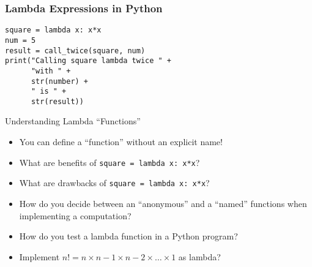 \documentclass[14pt,aspectratio=169]{beamer}
\begin{document}
%
\begin{frame}[fragile]
  \frametitle{Lambda Expressions in Python}
  \hspace*{-.1in}
  \begin{minipage}{6in}
    \begin{verbatim}
square = lambda x: x*x
num = 5
result = call_twice(square, num)
print("Calling square lambda twice " +
      "with " +
      str(number) +
      " is " +
      str(result))
    \end{verbatim}
  \end{minipage}
  \vspace*{.05in}
\end{frame}

%
\begin{frame}{Understanding Lambda ``Functions''}
  \begin{itemize} \vspace*{-.2in}
    \item You can define a ``function'' without an explicit name!
      \vspace*{-.2in}
    \item What are benefits of {\tt square = lambda x: x*x}?
      \vspace*{-.2in}
    \item What are drawbacks of {\tt square = lambda x: x*x}?
      \vspace*{-.2in}
    \item How do you decide between an ``anonymous'' and a ``named'' functions
      when implementing a computation?
      \vspace*{-.2in}
    \item How do you test a lambda function in a Python program?
      \vspace*{-.2in}
    \item Implement $n! = n \times n-1 \times n-2 \times \ldots \times 1$ as
      lambda?
      \vspace*{-.2in}
  \end{itemize}
\end{frame}
\end{document}
